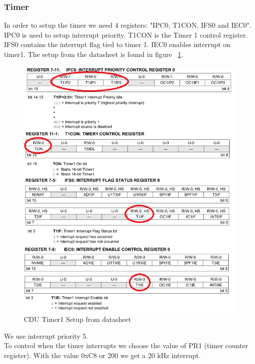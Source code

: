 \subsubsection{Timer}
In order to setup the timer we need 4 registers: "IPC0, T1CON, IFS0 and IEC0". IPC0 is used to setup interrupt priority. T1CON is the Timer 1 control register. IFS0 contains the interrupt flag tied to timer 1. IEC0 enables interrupt on timer1. The setup from the datasheet is found in figure ~\ref{fig:timersetup}.\\
\begin{figure}[H]
\centering
\includegraphics[width=1\textwidth]{billeder/timersetup}
\caption{CDU Timer1 Setup from datasheet}
\label{fig:timersetup}
\end{figure}
We use interrupt priority 5.\\
To control when the timer interrupts we choose the value of PR1 (timer counter register). With the value 0xC8 or 200 we get a 20 kHz interrupt.

